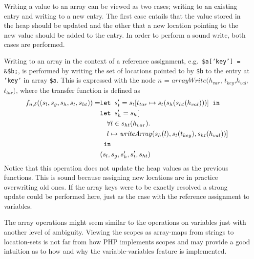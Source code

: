 Writing a value to an array can be viewed as two cases; writing to an existing entry and writing to a new entry. The first case entails that the value stored in the heap should be updated and the other that a new location pointing to the new value should be added to the entry. In order to perform a sound write, both cases are performed. 


Writing to an array in the context of a reference assignment, e.g.\ \texttt{\$a['key'] = \&\$b;}, is performed by writing the set of locations pointed to by \texttt{\$b} to the entry at \texttt{'key'} in array \texttt{\$a}.  This is expressed with the node $n$ = $\mathit{arrayWrite}(h_{var}$, $t_{key}$,$h_{val}$,$t_{tar})$, where the transfer function is defined as 
\begin{align}
    f_{n,\delta}((s_l, s_g, s_h, s_t, s_{ht})) = &\texttt{let } s_t' = s_t[t_{tar}\mapsto s_t(s_h(s_{ht}(h_{val})))] \texttt{ in }\notag\\
                              &\texttt{let } s_h' = s_h[\notag\\
                              &\quad \forall l \in s_{ht}(h_{var}).\notag\\
                              &\quad l\mapsto \mathit{writeArray}(s_h(l), s_t(t_{key}), s_{ht}(h_{val}))]\notag\\
                              & \texttt{ in }\notag\\
                              &(s_l, s_g, s_h', s_t', s_{ht})
\end{align}
Notice that this operation does not update the heap values as the previous functions. This is sound because assigning new locations are in practice overwriting old ones. If the array keys were to be exactly resolved a strong update could be performed here, just as the case with the reference assignment to variables.


The array operations might seem similar to the operations on variables just with another level of ambiguity. Viewing the scopes as array-maps from strings to location-sets is not far from how PHP implements scopes and may provide a good intuition as to how and why the variable-variables feature is implemented. 

